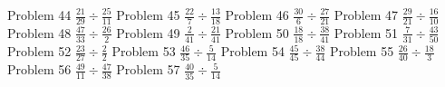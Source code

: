 \documentclass{article}
\begin{document}
\newline
\hfill \break
Problem 44
\newline
\hfill \break
$\displaystyle \frac{21}{29} \div \frac{25}{11}$
\newline
\hfill \break
Problem 45
\newline
\hfill \break
$\displaystyle \frac{22}{7} \div \frac{13}{18}$
\newline
\hfill \break
Problem 46
\newline
\hfill \break
$\displaystyle \frac{30}{6} \div \frac{27}{21}$
\newline
\hfill \break
Problem 47
\newline
\hfill \break
$\displaystyle \frac{29}{21} \div \frac{16}{10}$
\newline
\hfill \break
Problem 48
\newline
\hfill \break
$\displaystyle \frac{47}{33} \div \frac{26}{2}$
\newline
\hfill \break
Problem 49
\newline
\hfill \break
$\displaystyle \frac{2}{41} \div \frac{21}{41}$
\newline
\hfill \break
Problem 50
\newline
\hfill \break
$\displaystyle \frac{18}{18} \div \frac{38}{41}$
\newline
\hfill \break
Problem 51
\newline
\hfill \break
$\displaystyle \frac{7}{31} \div \frac{43}{50}$
\newline
\hfill \break
Problem 52
\newline
\hfill \break
$\displaystyle \frac{23}{27} \div \frac{2}{2}$
\newline
\hfill \break
Problem 53
\newline
\hfill \break
$\displaystyle \frac{46}{35} \div \frac{5}{14}$
\newline
\hfill \break
Problem 54
\newline
\hfill \break
$\displaystyle \frac{45}{45} \div \frac{38}{44}$
\newline
\hfill \break
Problem 55
\newline
\hfill \break
$\displaystyle \frac{26}{40} \div \frac{18}{3}$
\newline
\hfill \break
Problem 56
\newline
\hfill \break
$\displaystyle \frac{49}{11} \div \frac{47}{38}$
\newline
\hfill \break
Problem 57
\newline
\hfill \break
$\displaystyle \frac{40}{35} \div \frac{5}{14}$
\newline
\end{document}
